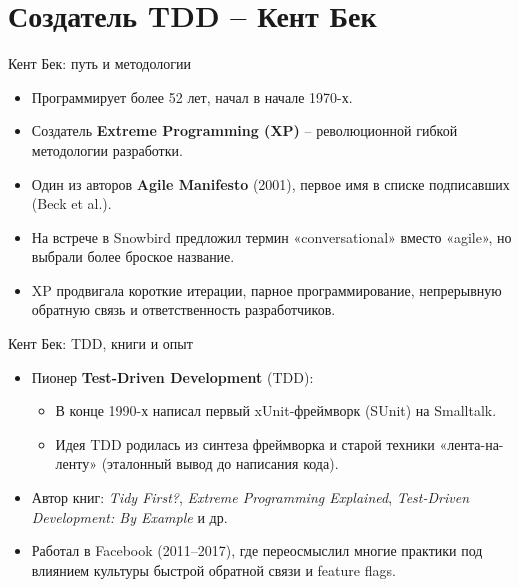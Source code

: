 \documentclass[14pt,aspectratio=169]{beamer}
\begin{document}
\section{Создатель TDD -- Кент Бек}

\begin{frame}{Кент Бек: путь и методологии}
    \begin{itemize}
        \item Программирует более 52 лет, начал в начале 1970-х.
        \item Создатель \textbf{Extreme Programming (XP)} -- революционной гибкой методологии разработки.
        \item Один из авторов \textbf{Agile Manifesto} (2001), первое имя в списке подписавших (Beck et al.).
        \item На встрече в Snowbird предложил термин «conversational» вместо «agile», но выбрали более броское название.
        \item XP продвигала короткие итерации, парное программирование, непрерывную обратную связь и ответственность разработчиков.
    \end{itemize}
\end{frame}

\begin{frame}{Кент Бек: TDD, книги и опыт}
    \begin{itemize}
        \item Пионер \textbf{Test-Driven Development} (TDD):
        \begin{itemize}
            \item В конце 1990-х написал первый xUnit-фреймворк (SUnit) на Smalltalk.
            \item Идея TDD родилась из синтеза фреймворка и старой техники «лента-на-ленту» (эталонный вывод до написания кода).
        \end{itemize}
        \item Автор книг: \textit{Tidy First?}, \textit{Extreme Programming Explained}, \textit{Test-Driven Development: By Example} и др.
        \item Работал в Facebook (2011–2017), где переосмыслил многие практики под влиянием культуры быстрой обратной связи и feature flags.
    \end{itemize}
\end{frame}
\end{document}
